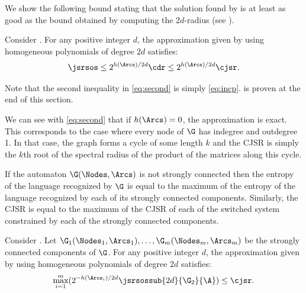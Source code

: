 \documentclass[11pt,twoside,a4paper,openright]{uclouvain-thesis}
\newcommand{\expfrac}[2]{#1/#2}
\begin{document}
We show the following bound stating that the solution found by  is at least as good as the bound obtained by computing the $2d$-radius (see ).
\begin{mytheo}
  \label{theo:second}
  Consider . For any positive integer $d$,
  the approximation given by  using homogeneous polynomials of degree $2d$
  satisfies:
  \begin{equation}
    \label{eq:second}
    \jsrsos \leq 2^{\expfrac{h(\Arcs)}{2d}}\cdr \leq 2^{\expfrac{h(\Arcs)}{2d}} \cjsr.
  \end{equation}
\end{mytheo}
Note that the second inequality in \eqref{eq:second} is simply \eqref{eq:incp}.
 is proven at the end of this section.

We can see with \eqref{eq:second} that if $h(\Arcs) = 0$, the approximation is exact.
This corresponds to the case where every node of $\G$ has indegree and outdegree 1.
In that case, the graph forms a cycle of some length $k$ and the CJSR is simply the $k$th root of the spectral radius of the product of the matrices along this cycle.

If the automaton $\G(\Nodes,\Arcs)$ is not strongly connected then
the entropy of the language recognized by $\G$ is equal to the maximum of the entropy
of the language recognized by each of its strongly connected components.
Similarly, the CJSR is equal to the maximum of the CJSR of each of the switched system
constrained by each of the strongly connected components.

\begin{mycoro}
  \label{coro:components}
  Consider . Let $\G_1(\Nodes_1, \Arcs_1), \ldots, \G_m(\Nodes_m, \Arcs_m)$
  be the strongly connected components of $\G$.
  For any positive integer $d$,
  the approximation given by  using homogeneous polynomials of degree $2d$
  satisfies:
  \begin{equation}
    \label{eq:components}
    \max_{i=1}^m(2^{-\expfrac{h(\Arcs_i)}{2d}}\jsrsossub{2d}{\G_2}{\A}) \leq \cjsr.
  \end{equation}
\end{mycoro}
\end{document}
